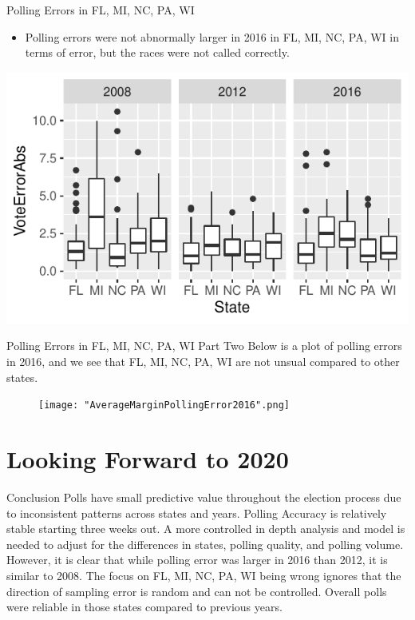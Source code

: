 \documentclass{beamer}\usepackage[]{graphicx}\usepackage[]{color}
\makeatletter
\def\maxwidth{ %
  \ifdim\Gin@nat@width>\linewidth
    \linewidth
  \else
    \Gin@nat@width
  \fi
}
\newenvironment{knitrout}{}{} %
\makeatother
\begin{document}
\begin{frame}{Polling Errors in FL, MI, NC, PA, WI}
\begin{itemize}
\item Polling errors were not abnormally larger in 2016 in FL, MI, NC, PA, WI in terms of error, but the races were not called correctly.  
\end{itemize}
\begin{knitrout}
\color{fgcolor}
\includegraphics[width=\maxwidth]{figure/unnamed-chunk-9-1} 

\end{knitrout}
\end{frame}



\begin{frame}{Polling Errors in FL, MI, NC, PA, WI Part Two}
Below is a plot of polling errors in 2016, and we see that FL, MI, NC, PA, WI are not unsual compared to other states. %
\begin{figure}[h]
       \centering
        \texttt{[image: "AverageMarginPollingError2016".png]}
    \end{figure}
\end{frame}


\section{Looking Forward to 2020}
\begin{frame}{Conclusion}
Polls have small predictive value throughout the election process due to inconsistent patterns across states and years. Polling Accuracy is relatively stable starting three weeks out.  A more controlled in depth analysis and model is needed to adjust for the differences in states, polling quality, and polling volume. However, it is clear that while polling error was larger in 2016 than 2012, it is similar to 2008.  The focus on FL, MI, NC, PA, WI being wrong ignores that the direction of sampling error is random and can not be controlled. Overall polls were reliable in those states compared to previous years.
\end{frame}
\end{document}
